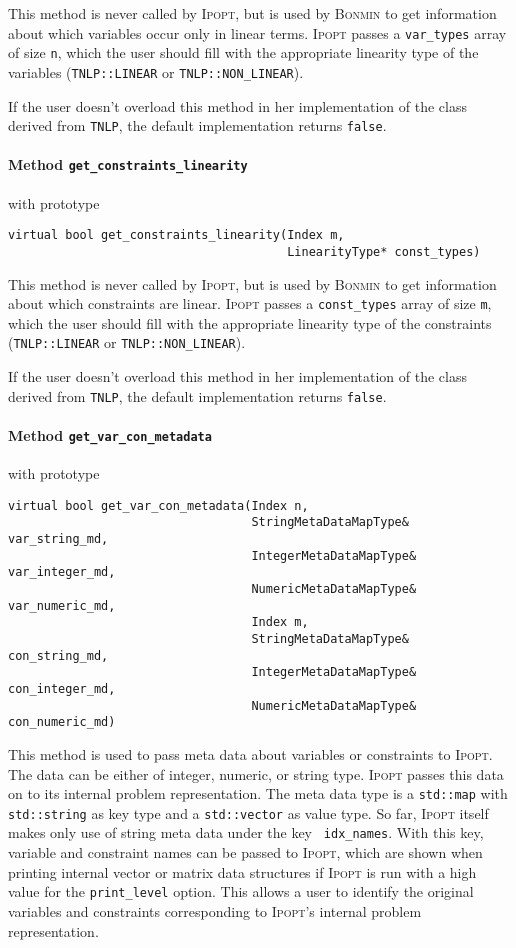 \documentclass[10pt]{article}
\newcommand{\Ipopt}{\textsc{Ipopt}\xspace}
\begin{document}
This method is never called by \Ipopt, but is used by \textsc{Bonmin} to get information about which variables occur only in linear terms.
\Ipopt passes a {\tt var\_types} array of size {\tt n}, which the user should fill with the appropriate linearity type of the variables ({\tt TNLP::LINEAR} or {\tt TNLP::NON\_LINEAR}).

If the user doesn't overload this method in her implementation of the class derived from {\tt TNLP}, the default implementation returns {\tt false}.

\paragraph{Method \texttt{get\_constraints\_linearity}} with prototype
\begin{verbatim}
virtual bool get_constraints_linearity(Index m,
                                       LinearityType* const_types)
\end{verbatim}

This method is never called by \Ipopt, but is used by \textsc{Bonmin} to get information about which constraints are linear.
\Ipopt passes a {\tt const\_types} array of size {\tt m}, which the user should fill with the appropriate linearity type of the constraints ({\tt TNLP::LINEAR} or {\tt TNLP::NON\_LINEAR}).

If the user doesn't overload this method in her implementation of the class derived from {\tt TNLP}, the default implementation returns {\tt false}.

\paragraph{Method \texttt{get\_var\_con\_metadata}} with prototype
\begin{verbatim}
virtual bool get_var_con_metadata(Index n,
                                  StringMetaDataMapType& var_string_md,
                                  IntegerMetaDataMapType& var_integer_md,
                                  NumericMetaDataMapType& var_numeric_md,
                                  Index m,
                                  StringMetaDataMapType& con_string_md,
                                  IntegerMetaDataMapType& con_integer_md,
                                  NumericMetaDataMapType& con_numeric_md)
\end{verbatim}

This method is used to pass meta data about variables or constraints to 
\Ipopt. The data can be either of integer, numeric, or string type.
\Ipopt passes this data on to its internal problem representation.
The meta data type is a {\tt std::map} with {\tt std::string} as key type and 
a {\tt std::vector} as value type.
So far, \Ipopt itself makes only use of string meta data under the key {\tt 
idx\_names}. With this key, variable and constraint names can be passed to 
\Ipopt, which are shown when printing internal vector or matrix data structures 
if \Ipopt is run with a high value for the {\tt print\_level} option. This 
allows a user to identify the original variables and constraints corresponding 
to \Ipopt's internal problem representation.
\end{document}
